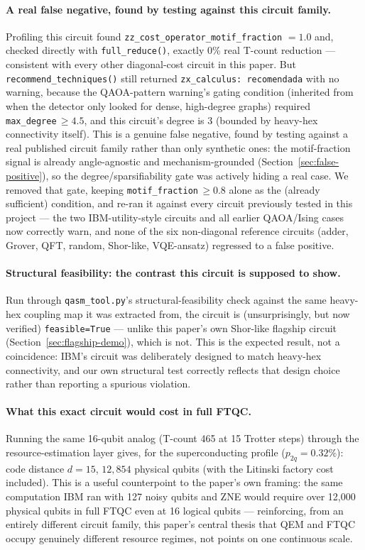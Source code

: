 \documentclass[9pt,twocolumn]{extarticle}
\begin{document}
\paragraph{A real false negative, found by testing against this circuit family.}
Profiling this circuit found \texttt{zz\_cost\_operator\_motif\_fraction}
$=1.0$ and, checked directly with \texttt{full\_reduce()}, exactly
0\% real T-count reduction --- consistent with every other diagonal-cost
circuit in this paper. But \texttt{recommend\_techniques()} still
returned \texttt{zx\_calculus: recomendada} with no warning, because the
QAOA-pattern warning's gating condition (inherited from when the detector
only looked for dense, high-degree graphs) required
\texttt{max\_degree}$\,\geq 4.5$, and this circuit's degree is 3 (bounded
by heavy-hex connectivity itself). This is a genuine false negative,
found by testing against a real published circuit family rather than
only synthetic ones: the motif-fraction signal is already
angle-agnostic and mechanism-grounded (Section~\ref{sec:false-positive}),
so the degree/sparsifiability gate was actively hiding a real case. We
removed that gate, keeping \texttt{motif\_fraction}$\,\geq 0.8$ alone as
the (already sufficient) condition, and re-ran it against every circuit
previously tested in this project --- the two IBM-utility-style circuits
and all earlier QAOA/Ising cases now correctly warn, and none of the six
non-diagonal reference circuits (adder, Grover, QFT, random, Shor-like,
VQE-ansatz) regressed to a false positive.

\paragraph{Structural feasibility: the contrast this circuit is supposed to show.}
Run through \texttt{qasm\_tool.py}'s structural-feasibility check
against the same heavy-hex coupling map it was extracted from, the
circuit is (unsurprisingly, but now verified) \texttt{feasible=True} ---
unlike this paper's own Shor-like flagship circuit
(Section~\ref{sec:flagship-demo}), which is not. This is the expected
result, not a coincidence: IBM's circuit was deliberately designed to
match heavy-hex connectivity, and our own structural test correctly
reflects that design choice rather than reporting a spurious violation.

\paragraph{What this exact circuit would cost in full FTQC.}
Running the same 16-qubit analog (T-count 465 at 15 Trotter steps)
through the resource-estimation layer gives, for the superconducting
profile ($p_{2q}=0.32\%$): code distance $d=15$, $12{,}854$ physical
qubits (with the Litinski factory cost included). This is a useful
counterpoint to the paper's own framing: the same computation IBM ran
with 127 noisy qubits and ZNE would require over 12{,}000 physical
qubits in full FTQC even at 16 logical qubits --- reinforcing, from an
entirely different circuit family, this paper's central thesis that QEM
and FTQC occupy genuinely different resource regimes, not points on one
continuous scale.
\end{document}
